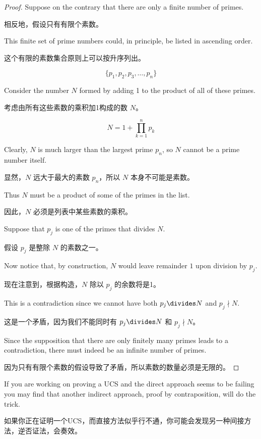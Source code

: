 \begin{proof}
Suppose on the contrary that there are only a finite number
of primes.

相反地，假设只有有限个素数。

This finite set of prime numbers could, in principle, be listed
in ascending order.

这个有限的素数集合原则上可以按升序列出。

\[  \{ p_1, p_2, p_3, \ldots , p_n \} \]

Consider the number $N$ formed by adding 1 to the product of all of these 
primes.

考虑由所有这些素数的乘积加1构成的数 $N$。

\[ N = 1 + \prod_{k=1}^n p_k \]

Clearly, $N$ is much larger than the largest prime $p_n$, so $N$ cannot
be a prime number itself.

显然，$N$ 远大于最大的素数 $p_n$，所以 $N$ 本身不可能是素数。

Thus $N$ must be a product of some of the 
primes in the list.

因此，$N$ 必须是列表中某些素数的乘积。

Suppose that $p_j$ is one of the primes that 
divides $N$.

假设 $p_j$ 是整除 $N$ 的素数之一。

Now notice that, by construction, $N$ would leave remainder
$1$ upon division by $p_j$.

现在注意到，根据构造，$N$ 除以 $p_j$ 的余数将是1。

This is a contradiction since we cannot have
both $p_j \divides N$ and $p_j \nmid N$.

这是一个矛盾，因为我们不能同时有 $p_j \divides N$ 和 $p_j \nmid N$。

Since the supposition that there are only finitely many primes leads to
a contradiction, there must indeed be an infinite number of primes.

因为只有有限个素数的假设导致了矛盾，所以素数的数量必须是无限的。
\end{proof}

If you are working on proving a UCS and the direct approach seems to be
failing you may find that another indirect approach, 
proof by contraposition,
will do the trick.

如果你正在证明一个UCS，而直接方法似乎行不通，你可能会发现另一种间接方法，逆否证法，会奏效。

